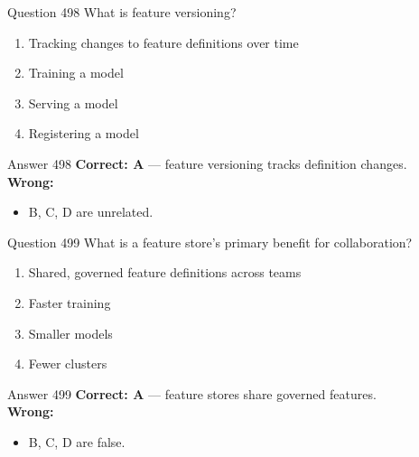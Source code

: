\documentclass[aspectratio=169,11pt]{beamer}
\begin{document}
	\begin{frame}{Question 498}
		What is feature versioning?
		\begin{enumerate}[label=\Alph*.]
			\item Tracking changes to feature definitions over time
			\item Training a model
			\item Serving a model
			\item Registering a model
		\end{enumerate}
	\end{frame}
	\begin{frame}{Answer 498}
		\textbf{Correct: A} --- feature versioning tracks definition changes.\\
		\vspace{0.5em}
		\textbf{Wrong:}
		\begin{itemize}
			\item B, C, D are unrelated.
		\end{itemize}
	\end{frame}
	
	\begin{frame}{Question 499}
		What is a feature store's primary benefit for collaboration?
		\begin{enumerate}[label=\Alph*.]
			\item Shared, governed feature definitions across teams
			\item Faster training
			\item Smaller models
			\item Fewer clusters
		\end{enumerate}
	\end{frame}
	\begin{frame}{Answer 499}
		\textbf{Correct: A} --- feature stores share governed features.\\
		\vspace{0.5em}
		\textbf{Wrong:}
		\begin{itemize}
			\item B, C, D are false.
		\end{itemize}
	\end{frame}
	
\end{document}
